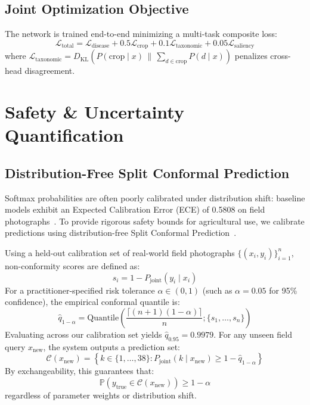 \documentclass[conference]{IEEEtran}
\begin{document}
\subsection{Joint Optimization Objective}
The network is trained end-to-end minimizing a multi-task composite loss:
\begin{equation}
\mathcal{L}_{\text{total}} = \mathcal{L}_{\text{disease}} + 0.5 \mathcal{L}_{\text{crop}} + 0.1 \mathcal{L}_{\text{taxonomic}} + 0.05 \mathcal{L}_{\text{saliency}}
\end{equation}
where $\mathcal{L}_{\text{taxonomic}} = D_{\text{KL}}(P(\text{crop} \mid x) \,\|\, \sum_{d \in \text{crop}} P(d \mid x))$ penalizes cross-head disagreement.

\section{Safety \& Uncertainty Quantification}

\subsection{Distribution-Free Split Conformal Prediction}
Softmax probabilities are often poorly calibrated under distribution shift: baseline models exhibit an Expected Calibration Error (ECE) of 0.5808 on field photographs~\cite{guo2017calibration}. To provide rigorous safety bounds for agricultural use, we calibrate predictions using distribution-free Split Conformal Prediction~\cite{vovk2005algorithmic, angelopoulos2021gentle}.

Using a held-out calibration set of real-world field photographs $\{(x_i, y_i)\}_{i=1}^n$, non-conformity scores are defined as:
\begin{equation}
s_i = 1 - P_{\text{joint}}(y_i \mid x_i)
\end{equation}
For a practitioner-specified risk tolerance $\alpha \in (0, 1)$ (such as $\alpha = 0.05$ for 95\% confidence), the empirical conformal quantile is:
\begin{equation}
\hat{q}_{1-\alpha} = \text{Quantile}\left( \frac{\lceil (n+1)(1-\alpha) \rceil}{n}; \{s_1, \ldots, s_n\} \right)
\end{equation}
Evaluating across our calibration set yields $\hat{q}_{0.95} = 0.9979$. For any unseen field query $x_{\text{new}}$, the system outputs a prediction set:
\begin{equation}
\mathcal{C}(x_{\text{new}}) = \left\{ k \in \{1, \ldots, 38\} : P_{\text{joint}}(k \mid x_{\text{new}}) \ge 1 - \hat{q}_{1-\alpha} \right\}
\end{equation}
By exchangeability, this guarantees that:
\begin{equation}
\mathbb{P}\left( y_{\text{true}} \in \mathcal{C}(x_{\text{new}}) \right) \ge 1 - \alpha
\end{equation}
regardless of parameter weights or distribution shift.
\end{document}
